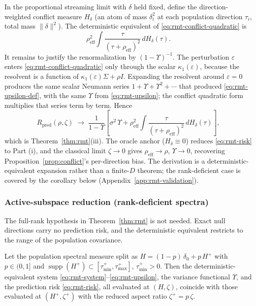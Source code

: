 In the proportional streaming limit with $\delta$ held fixed, define the direction-weighted conflict measure $H_\delta$ (an atom of mass $\delta_i^2$ at each population direction $\tau_i$, total mass $\|\delta\|^2$).
The deterministic equivalent of \eqref{eq:rmt-conflict-quadratic} is
\begin{equation}
\label{eq:rmt-conflict-de}
\rho_{\mathrm{eff}}^2 \int \frac{\tau}{(\tau + \rho_{\mathrm{eff}})^2}\, dH_\delta(\tau).
\end{equation}
It remains to justify the renormalization by $(1-\Upsilon)^{-1}$.
The perturbation $\varepsilon$ enters \eqref{eq:rmt-conflict-quadratic} only through the scalar $\kappa_1(\varepsilon)$, because the resolvent is a function of $\kappa_1(\varepsilon)\Sigma + \rho I$.
Expanding the resolvent around $\varepsilon = 0$ produces the same scalar Neumann series $1 + \Upsilon + \Upsilon^2 + \cdots$ that produced \eqref{eq:rmt-upsilon-def}, with the same $\Upsilon$ from \eqref{eq:rmt-upsilon}; the conflict quadratic form multiplies that series term by term.
Hence
\begin{equation}
\label{eq:rmt-risk}
R_{\mathrm{pred}}(\rho, \zeta) \;\to\;
\frac{1}{1 - \Upsilon}\left[\sigma^2\,\Upsilon
+ \rho_{\mathrm{eff}}^2 \int \frac{\tau}{(\tau + \rho_{\mathrm{eff}})^2}\, dH_\delta(\tau)\right],
\end{equation}
which is Theorem~\ref{thm:rmt}(iii).
The oracle anchor ($H_\delta \equiv 0$) reduces \eqref{eq:rmt-risk} to Part (i), and the classical limit $\zeta \to 0$ gives $\rho_{\mathrm{eff}} \to \rho$, $\Upsilon \to 0$, recovering Proposition~\ref{prop:conflict}'s per-direction bias.
The derivation is a deterministic-equivalent expansion rather than a finite-$D$ theorem; the rank-deficient case is covered by the corollary below (Appendix~\ref{app:rmt-validation}).

\subsubsection{Active-subspace reduction (rank-deficient spectra)}
\label{app:rmt-active}

The full-rank hypothesis in Theorem~\ref{thm:rmt} is not needed.
Exact null directions carry no prediction risk, and the deterministic equivalent restricts to the range of the population covariance.

\begin{corollary}
\label{cor:rmt-active}
Let the population spectral measure split as $H = (1-p)\,\delta_0 + p\,H^+$ with $p \in (0,1]$ and $\operatorname{supp}(H^+) \subset [\tau^+_{\min}, \tau^+_{\max}]$, $\tau^+_{\min} > 0$.
Then the deterministic-equivalent system \eqref{eq:rmt-system}--\eqref{eq:rmt-upsilon}, the variance functional $\Upsilon$, and the prediction risk \eqref{eq:rmt-risk}, all evaluated at $(H, \zeta)$, coincide with those evaluated at $(H^+, \zeta^+)$ with the reduced aspect ratio $\zeta^+ = p\,\zeta$.
\end{corollary}

